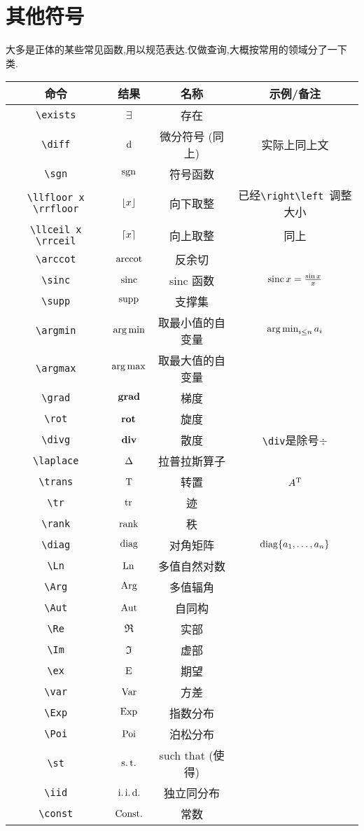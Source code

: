 \documentclass[lang=cn,12pt,scheme=chinese,mode=simple,black]{elegantbook}
\begin{document}
\newpage
\section{其他符号}
大多是正体的某些常见函数,用以规范表达.仅做查询,大概按常用的领域分了一下类.

\begin{center}
\setlength{\tabcolsep}{10pt}
\begin{tabular}{|c|c|c|c|}
\hline
\textbf{命令} & \textbf{结果} & \textbf{名称} & \textbf{示例/备注}\\
\hline
\verb|\exists| & $\exists$ & 存在 & \\
\verb|\diff| & $\diff$ & 微分符号 (同上) & 实际上同上文\\
\verb|\sgn| & $\sgn$ & 符号函数 & \\
\verb|\llfloor x \rrfloor| & $\llfloor x \rrfloor$ & 向下取整 & 已经\verb|\right\left |调整大小\\
\verb|\llceil x \rrceil| & $\llceil x \rrceil$ & 向上取整 & 同上\\
\verb|\arccot| & $\arccot$ & 反余切 & \\
\verb|\sinc| & $\sinc$ & sinc 函数 & $\sinc x = \frac{\sin x}{x}$\\
\verb|\supp| & $\supp$ & 支撑集 & \\
\verb|\argmin| & $\argmin$ & 取最小值的自变量 & $\argmin_{i \le n} a_i$\\
\verb|\argmax| & $\argmax$ & 取最大值的自变量 & \\
\verb|\grad| & $\grad$ & 梯度 & \\
\verb|\rot| & $\rot$ & 旋度 & \\
\verb|\divg| & $\divg$ & 散度 & \verb|\div|是除号$\div$\\
\verb|\laplace| & $\laplace$ & 拉普拉斯算子 & \\
\verb|\trans| & $\trans$ & 转置 & $A^{\trans}$\\
\verb|\tr| & $\tr$ & 迹 & \\
\verb|\rank| & $\rank$ & 秩 & \\
\verb|\diag| & $\diag$ & 对角矩阵 & $\diag\{a_1,\dots,a_n\}$\\
\verb|\Ln| & $\Ln$ & 多值自然对数 & \\
\verb|\Arg| & $\Arg$ & 多值辐角 & \\
\verb|\Aut| & $\Aut$ & 自同构 & \\
\verb|\Re| & $\Re$ & 实部 & \\
\verb|\Im| & $\Im$ & 虚部 & \\
\verb|\ex| & $\ex$ & 期望 & \\
\verb|\var| & $\var$ & 方差 & \\
\verb|\Exp| & $\Exp$ & 指数分布 & \\
\verb|\Poi| & $\Poi$ & 泊松分布 & \\
\verb|\st| & $\st$ & such that (使得) & \\
\verb|\iid| & $\iid$ & 独立同分布 & \\
\verb|\const| & $\const$ & 常数 & \\
\hline
\end{tabular}
\end{center}
\end{document}
